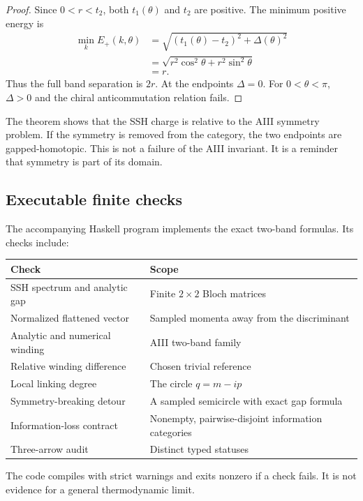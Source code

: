 \documentclass[12pt]{article}
\theoremstyle{definition}
\theoremstyle{remark}
\begin{document}
\begin{proof}
Since $0<r<t_2$, both $t_1(\theta)$ and $t_2$ are positive.
The minimum positive energy is
\[
\begin{aligned}
\min_k E_+(k,\theta)
&=
\sqrt{(t_1(\theta)-t_2)^2+\Delta(\theta)^2}
\\
&=
\sqrt{r^2\cos^2\theta+r^2\sin^2\theta}
\\
&=r.
\end{aligned}
\]
Thus the full band separation is $2r$.
At the endpoints $\Delta=0$.
For $0<\theta<\pi$, $\Delta>0$ and the chiral anticommutation relation
fails.
\end{proof}

The theorem shows that the SSH charge is relative to the AIII symmetry
problem.
If the symmetry is removed from the category, the two endpoints are
gapped-homotopic.
This is not a failure of the AIII invariant.
It is a reminder that symmetry is part of its domain.

\subsection{Executable finite checks}

The accompanying Haskell program implements the exact two-band formulas.
Its checks include:

\begin{center}
\begin{tabular}{p{}p{}}
\toprule
Check & Scope \\
\midrule
SSH spectrum and analytic gap & Finite $2\times2$ Bloch matrices \\
Normalized flattened vector & Sampled momenta away from the discriminant \\
Analytic and numerical winding & AIII two-band family \\
Relative winding difference & Chosen trivial reference \\
Local linking degree & The circle $q=m-ip$ \\
Symmetry-breaking detour & A sampled semicircle with exact gap formula \\
Information-loss contract & Nonempty, pairwise-disjoint information categories \\
Three-arrow audit & Distinct typed statuses \\
\bottomrule
\end{tabular}
\end{center}

The code compiles with strict warnings and exits nonzero if a check fails.
It is not evidence for a general thermodynamic limit.
\end{document}
